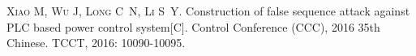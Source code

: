 
\begin{publications}{99}
    \item\textsc{Xiao M, Wu J, Long C~N, Li S~Y}. {Construction of false sequence attack against PLC based power control system}[C]. Control Conference (CCC), 2016 35th Chinese. TCCT, 2016: 10090-10095.
\end{publications}
